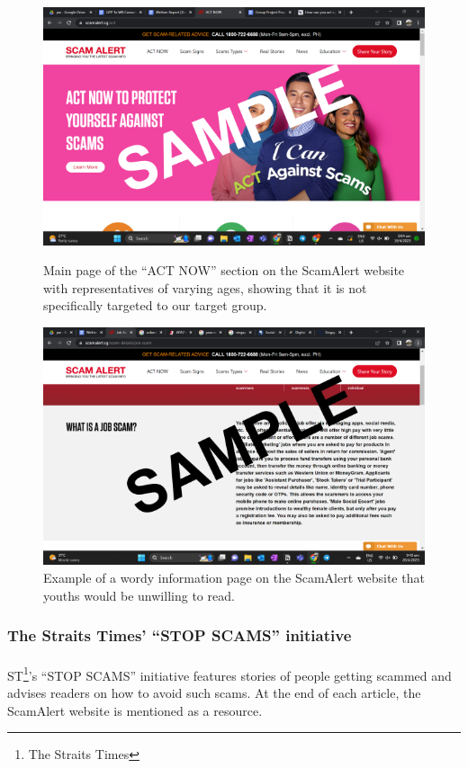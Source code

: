 \documentclass[a4paper]{article}
\begin{document}
\begin{figure}[ht]
  \centering \includegraphics[width=\textwidth]{scamalert}
  \caption{Main page of the ``ACT NOW'' section on the ScamAlert website with
    representatives of varying ages, showing that it is not specifically
    targeted to our target group.}\label{fig:scamalert}
  \endminipage\hfill
  \centering \includegraphics[width=\textwidth]{scamalertwordy}
  \caption{Example of a wordy information page on the ScamAlert website that
    youths would be unwilling to read.}\label{fig:scamalertwordy}
  \endminipage{}
\end{figure}

\subsubsection{The Straits Times' ``STOP SCAMS'' initiative}
\paragraph{} ST\footnote{The Straits Times}'s ``STOP SCAMS'' initiative features
stories of people getting scammed and advises readers on how to avoid such
scams. At the end of each article, the ScamAlert website is mentioned as a
resource.
\end{document}
